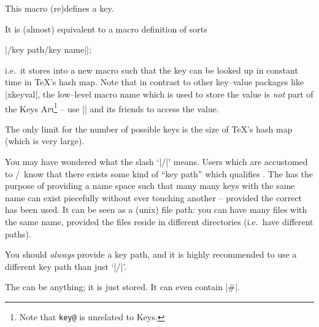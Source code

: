 \documentclass[a4paper]{ltxdoc}
\def\API{\textsc{Api}}%
\begin{document}
\begin{command}{\pgfkeyssetvalue{}}
	This macro (re)defines a key. 
	
	It is (almost) equivalent to a macro definition of sorts

|\expandafter\def\csname key@|\meta{/key path/key name}|\endcsname|;

	i.e.\ it stores  into a new macro such that the key can be looked up in constant time in \TeX's hash map. 
	Note that in contrast to other key--value packages like |xkeyval|, the low--level macro name which is used to store the value is \emph{not} part of the \PGF Keys \API\footnote{Note that \texttt{key@} is unrelated to \PGF Keys.} -- use |\pgfkeysgetvalue| and its friends to access the value.

	The only limit for the number of possible keys is the size of \TeX's hash map (which is very large).

	You may have wondered what the slash `|/|' means. Users which are accustomed to \PGF/\PGFPlots\ know that there exists some kind of ``key path'' which qualifies . The  has the purpose of providing a name space such that many many keys with the same name can exist piecefully without ever touching another -- provided the correct  has been used. It can be seen as a (unix) file path: you can have many files with the same name, provided the files reside in different directories (i.e.\ have different paths).

	You should \emph{always} provide a key path, and it is highly recommended to use a different key path than just `|/|'.

	The  can be anything; it is just stored. It can even contain |#|.
\end{command}
\end{document}
